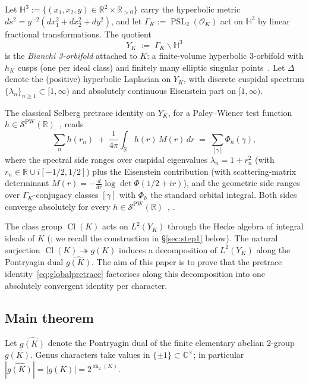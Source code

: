 \documentclass[11pt,a4paper,reqno]{amsart}
\theoremstyle{definition}
\DeclareMathOperator{\PSL}{PSL}
\DeclareMathOperator{\Cl}{Cl}
\DeclareMathOperator{\rk}{rk}
\newcommand{\OK}{\mathcal{O}_K}
\newcommand{\HH}{\mathbb{H}}
\newcommand{\RR}{\mathbb{R}}
\newcommand{\CC}{\mathbb{C}}
\newcommand{\YK}{Y_K}
\newcommand{\GK}{\Gamma_K}
\newcommand{\gK}{g(K)}
\newcommand{\dualgK}{\widehat{g(K)}}
\newcommand{\PW}{\mathcal{S}^{\mathrm{PW}}}
\begin{document}
Let $\HH^3 := \{(x_1,x_2,y)\in\RR^2\times\RR_{>0}\}$ carry the hyperbolic metric $ds^2=y^{-2}(dx_1^2+dx_2^2+dy^2)$, and let $\GK := \PSL_2(\OK)$ act on $\HH^3$ by linear fractional transformations. The quotient
\[
  \YK \;:=\; \GK\backslash\HH^3
\]
is the \emph{Bianchi 3-orbifold} attached to $K$: a finite-volume hyperbolic 3-orbifold with $h_K$ cusps (one per ideal class) and finitely many elliptic singular points~\cite[\S1.5 Cor.~5.5]{ElstrodtGrunewaldMennicke1998}. Let $\Delta$ denote the (positive) hyperbolic Laplacian on $\YK$, with discrete cuspidal spectrum $\{\lambda_n\}_{n\geq 1}\subset[1,\infty)$ and absolutely continuous Eisenstein part on $[1,\infty)$.

The classical Selberg pretrace identity on $\YK$, for a Paley--Wiener test function $h\in\PW(\RR)$~\cite[\S6.5]{ElstrodtGrunewaldMennicke1998}, reads
\begin{equation}\label{eq:globalpretrace}
  \sum_n h(r_n) \;+\; \frac{1}{4\pi}\int_{\RR} h(r)\,M(r)\,dr
  \;=\; \sum_{[\gamma]}\Phi_h(\gamma),
\end{equation}
where the spectral side ranges over cuspidal eigenvalues $\lambda_n = 1+r_n^2$ (with $r_n\in\RR\cup i[-1/2,1/2]$) plus the Eisenstein contribution (with scattering-matrix determinant $M(r) = -\frac{d}{dr}\log\det\Phi(1/2+ir)$), and the geometric side ranges over $\GK$-conjugacy classes $[\gamma]$ with $\Phi_h$ the standard orbital integral. Both sides converge absolutely for every $h\in\PW(\RR)$~\cite[\S6.4]{ElstrodtGrunewaldMennicke1998}, \cite[\S2.2]{BunkeOlbrich1995}.

\smallskip

The class group $\Cl(K)$ acts on $L^2(\YK)$ through the Hecke algebra of integral ideals of $K$ (\cite[\S7.6]{ElstrodtGrunewaldMennicke1998}; we recall the construction in \S\ref{sec:step1} below). The natural surjection $\Cl(K)\twoheadrightarrow\gK$ induces a decomposition of $L^2(\YK)$ along the Pontryagin dual $\dualgK$. The aim of this paper is to prove that the pretrace identity~\eqref{eq:globalpretrace} factorises along this decomposition into one absolutely convergent identity per character.

\subsection{Main theorem}\label{ss:mainthm}

Let $\dualgK$ denote the Pontryagin dual of the finite elementary abelian 2-group $\gK$. Genus characters take values in $\{\pm 1\}\subset\CC^\times$; in particular $|\dualgK|=|\gK|=2^{\rk_2(K)}$.
\end{document}
